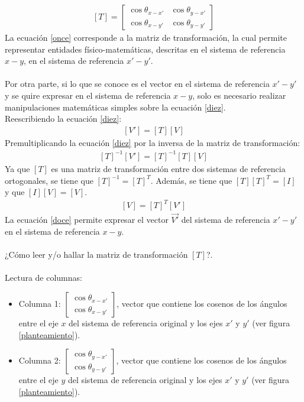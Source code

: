 \documentclass[12pt,letterpaper]{article}
\begin{document}
%
\begin{align}
	\left[ T \right] = \left[ \begin{array}{cc}
		\cos \theta_{x-x'} & \cos \theta_{y-x'} \\
		\cos \theta_{x-y'} & \cos \theta_{y-y'}	
	\end{array} \right] \label{once}
\end{align}
%
La  ecuación \ref{once} corresponde a la matriz de transformación, la cual permite representar entidades físico-matemáticas, descritas en el sistema de referencia $x-y$, en el sistema de referencia $x'-y'$.\\\\

Por otra parte, si lo que se conoce es el vector en el sistema de referencia $x'-y'$ y se quire  expresar en el sistema de referencia $x-y$, solo es necesario realizar manipulaciones matemáticas simples sobre la ecuación \ref{diez}.\\
%
Reescribiendo la ecuación \ref{diez}:
%
\begin{align*}
	\left[ V' \right] = \left[ T \right] \left[ V \right]
\end{align*}
%
Premultiplicando la ecuación \ref{diez} por la inversa de la matriz de transformación:
%
\begin{align*}
	\left[ T \right]^{-1} \left[ V' \right] = \left[ T \right]^{-1} \left[ T \right] \left[ V \right]
\end{align*}
%
Ya que $\left[ T \right]$ es una matriz de transformación entre dos sistemas de referencia ortogonales, se tiene que $\left[ T \right]^{-1} = \left[ T \right]^T$. Además, se tiene que $\left[ T \right] \left[ T \right]^T = \left[ I \right]$ y que $\left[ I \right] \left[ V \right] = \left[ V \right]$.
%
\begin{align}
	\left[ V \right] = \left[ T \right]^T \left[ V' \right] \label{doce}
\end{align}
%
La ecuación \ref{doce} permite expresar el vector $\overset{\rightarrow}{V'}$ del sistema de referencia $x'-y'$ en el sistema de referencia $x-y$.\\\\
%
¿Cómo leer y/o hallar la matriz de transformación $\left[ T \right]$?.\\\\
Lectura de columnas:
%
\begin{itemize}
	\item Columna 1: $ \left[ \begin{array}{c}
		\cos \theta_{x-x'} \\	 \cos \theta_{x-y'}
	\end{array} \right]$, vector que contiene los cosenos de los ángulos entre el eje $x$ del sistema de referencia original y los ejes $x'$ y $y'$ (ver figura \ref{planteamiento}).
	\item Columna 2: $ \left[ \begin{array}{c}
		\cos \theta_{y-x'} \\	 \cos \theta_{y-y'}
	\end{array} \right]$, vector que contiene los cosenos de los ángulos entre el eje $y$ del sistema de referencia original y los ejes $x'$ y $y'$ (ver figura \ref{planteamiento}).
\end{itemize}
\end{document}

